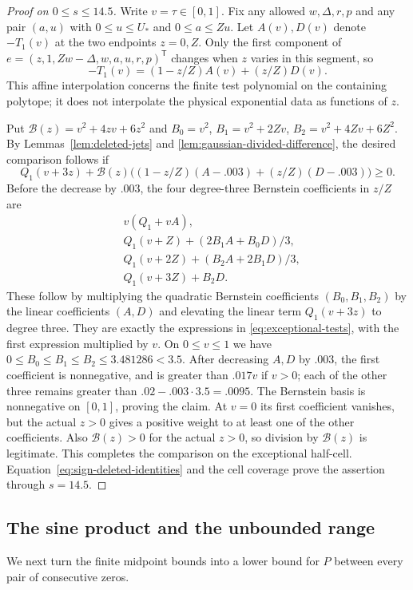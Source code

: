 \documentclass[11pt]{article}
\theoremstyle{remark}\newtheorem{remark}[theorem]{Remark}
\begin{document}
\begin{proof}[Proof on $0\le s\le14.5$]
Write $v=\tau\in[0,1]$. Fix any allowed $w,\Delta,r,p$ and any pair
$(a,u)$ with $0\le u\le U_*$ and $0\le a\le Zu$. Let $A(v),D(v)$
denote $-T_1(v)$ at the two endpoints $z=0,Z$. Only the first component of
$e=(z,1,Zw-\Delta,w,a,u,r,p)^{\mathsf T}$ changes when $z$
varies in this segment, so
\[
 -T_1(v)=(1-z/Z)A(v)+(z/Z)D(v).
\]
This affine interpolation concerns the finite test polynomial on the
containing polytope; it does not interpolate the physical exponential
data as functions of $z$.

Put $\mathcal B(z)=v^2+4zv+6z^2$ and
$B_0=v^2$, $B_1=v^2+2Zv$, $B_2=v^2+4Zv+6Z^2$.
By Lemmas~\ref{lem:deleted-jets} and
\ref{lem:gaussian-divided-difference}, the desired comparison follows
if
\[
 Q_1(v+3z)+\mathcal B(z)
 \bigl((1-z/Z)(A-.003)+(z/Z)(D-.003)\bigr)\ge0.
\]
Before the decrease by $.003$, the four degree-three Bernstein
coefficients in $z/Z$ are
\[
\begin{split}
 &v(Q_1+vA),\\
 &Q_1(v+Z)+(2B_1A+B_0D)/3,\\
 &Q_1(v+2Z)+(B_2A+2B_1D)/3,\\
 &Q_1(v+3Z)+B_2D.
\end{split}
\]
These follow by multiplying the quadratic Bernstein coefficients
$(B_0,B_1,B_2)$ by the linear coefficients $(A,D)$ and elevating
the linear term $Q_1(v+3z)$ to degree three.  They are exactly
the expressions in \eqref{eq:exceptional-tests}, with the first
expression multiplied by $v$.
On $0\le v\le1$ we have
$0\le B_0\le B_1\le B_2\le3.481286<3.5$.
After decreasing $A,D$ by $.003$, the first coefficient is
nonnegative, and is greater than $.017v$ if $v>0$; each of the
other three remains greater than $.02-.003\cdot3.5=.0095$.
The Bernstein basis is nonnegative on $[0,1]$, proving the claim.
At $v=0$ its first coefficient vanishes, but the actual $z>0$
gives a positive weight to at least one of the other coefficients.
Also $\mathcal B(z)>0$ for the actual $z>0$, so division by $\mathcal B(z)$ is
legitimate.  This completes the comparison on the exceptional
half-cell.  Equation~\eqref{eq:sign-deleted-identities} and the
cell coverage prove the assertion through $s=14.5$.
\end{proof}

\subsection{The sine product and the unbounded range}

We next turn the finite midpoint bounds into a lower bound for $P$
between every pair of consecutive zeros.
\end{document}
